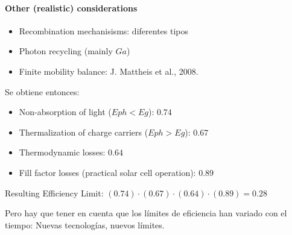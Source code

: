 \paragraph{Other (realistic) considerations}
\begin{itemize}
	\item Recombination mechanisisms: diferentes tipos
	\item Photon recycling (mainly $ Ga $)
	\item Finite mobility balance: J. Mattheis et al., 2008.
\end{itemize}

Se obtiene entonces:
\begin{itemize}
	\item Non-absorption of light ($ Eph < Eg $): $ 0.74  $
	\item Thermalization of charge carriers ($ Eph > Eg $): $ 0.67 $
	\item Thermodynamic losses: $ 0.64 $
	\item Fill factor losses (practical solar cell operation): $  0.89 $
\end{itemize}
Resulting Efficiency Limit: $ (0.74) \cdot (0.67) \cdot (0.64) \cdot (0.89) = 0.28 $

Pero hay que tener en cuenta que los límites de eficiencia han variado con el tiempo: Nuevas tecnologías, nuevos límites.